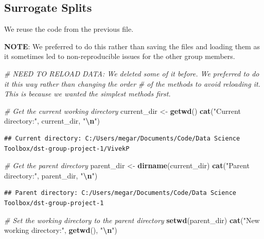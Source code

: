 \documentclass[
]{article}
\newenvironment{Shaded}{\begin{snugshade}}{\end{snugshade}}
\newcommand{\CommentTok}[1]{\textcolor[rgb]{0.56,0.35,0.01}{\textit{#1}}}
\newcommand{\FunctionTok}[1]{\textcolor[rgb]{0.13,0.29,0.53}{\textbf{#1}}}
\newcommand{\NormalTok}[1]{#1}
\newcommand{\OtherTok}[1]{\textcolor[rgb]{0.56,0.35,0.01}{#1}}
\newcommand{\SpecialCharTok}[1]{\textcolor[rgb]{0.81,0.36,0.00}{\textbf{#1}}}
\newcommand{\StringTok}[1]{\textcolor[rgb]{0.31,0.60,0.02}{#1}}
\begin{document}
\subsection{Surrogate Splits}\label{surrogate-splits}

We reuse the code from the previous file.

\textbf{NOTE}: We preferred to do this rather than saving the files and loading them as it sometimes led to non-reproducible issues for the other group members.

\begin{Shaded}
\begin{Highlighting}[]
\CommentTok{\# NEED TO RELOAD DATA: We deleted some of it before. We preferred to do it this way rather than changing the order}
\CommentTok{\# of the methods to avoid reloading it. This is because we wanted the simplest methods first.}

\CommentTok{\# Get the current working directory}
\NormalTok{current\_dir }\OtherTok{\textless{}{-}} \FunctionTok{getwd}\NormalTok{()}
\FunctionTok{cat}\NormalTok{(}\StringTok{"Current directory:"}\NormalTok{, current\_dir, }\StringTok{"}\SpecialCharTok{\textbackslash{}n}\StringTok{"}\NormalTok{)}
\end{Highlighting}
\end{Shaded}

\begin{verbatim}
## Current directory: C:/Users/megar/Documents/Code/Data Science Toolbox/dst-group-project-1/VivekP
\end{verbatim}

\begin{Shaded}
\begin{Highlighting}[]
\CommentTok{\# Get the parent directory}
\NormalTok{parent\_dir }\OtherTok{\textless{}{-}} \FunctionTok{dirname}\NormalTok{(current\_dir)}
\FunctionTok{cat}\NormalTok{(}\StringTok{"Parent directory:"}\NormalTok{, parent\_dir, }\StringTok{"}\SpecialCharTok{\textbackslash{}n}\StringTok{"}\NormalTok{)}
\end{Highlighting}
\end{Shaded}

\begin{verbatim}
## Parent directory: C:/Users/megar/Documents/Code/Data Science Toolbox/dst-group-project-1
\end{verbatim}

\begin{Shaded}
\begin{Highlighting}[]
\CommentTok{\# Set the working directory to the parent directory}
\FunctionTok{setwd}\NormalTok{(parent\_dir)}
\FunctionTok{cat}\NormalTok{(}\StringTok{"New working directory:"}\NormalTok{, }\FunctionTok{getwd}\NormalTok{(), }\StringTok{"}\SpecialCharTok{\textbackslash{}n}\StringTok{"}\NormalTok{)}
\end{Highlighting}
\end{Shaded}
\end{document}

